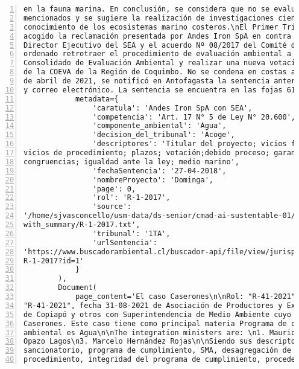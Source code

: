 \begin{Verbatim}[frame=lines, label=Elavoración propia -  Ejemplo de Contexto enviado por el Chatbot a OpenAI
				, fontsize=\scriptsize, numbers=left
				, baselinestretch=0.4
				, formatcom=\color{gray}]
en la fauna marina. En conclusión, se considera que no se evaluaron adecuadamente los impactos
mencionados y se sugiere la realización de investigaciones científicas para incrementar el
conocimiento de los ecosistemas marino costeros.\nEl Primer Tribunal Ambiental de Chile ha
acogido la reclamación presentada por Andes Iron SpA en contra de la Resolución 1146 del
Director Ejecutivo del SEA y el acuerdo Nº 08/2017 del Comité de Ministros. El tribunal ha
ordenado retrotraer el procedimiento de evaluación ambiental a la etapa posterior al Informe
Consolidado de Evaluación Ambiental y realizar una nueva votación ajustada a derecho por parte
de la COEVA de la Región de Coquimbo. No se condena en costas a las partes.\nResumen:\n\nEl 16
de abril de 2021, se notificó en Antofagasta la sentencia anterior a través del estado diario
y correo electrónico. La sentencia se encuentra en las fojas 6156.',
            metadata={
                'caratula': 'Andes Iron SpA con SEA',
                'competencia': 'Art. 17 N° 5 de Ley N° 20.600',
                'componente_ambiental': 'Agua',
                'decision_del_tribunal': 'Acoge',
                'descriptores': 'Titular del proyecto; vicios formales; motivaciòn; nulidad;
vicios de procedimiento; plazos; votación;debido proceso; garantías; contradictoriedad;
congruencias; igualdad ante la ley; medio marino',
                'fechaSentencia': '27-04-2018',
                'nombreProyecto': 'Dominga',
                'page': 0,
                'rol': 'R-1-2017',
                'source':
'/home/sjvasconcello/usm-data/ds-senior/cmad-ai-sustentable-01/etl/load/../../data/clean/docs_
with_summary/R-1-2017.txt',
                'tribunal': '1TA',
                'urlSentencia':
'https://www.buscadorambiental.cl/buscador-api/file/view/jurisprudencia/S1TA Rol N°
R-1-2017?id=1'
            }
        ),
        Document(
            page_content='El caso Caserones\n\nRol: "R-41-2021", Rol: "R-41-2021",Rol:
"R-41-2021", fecha 31-08-2021 de Asociación de Productores y Exportadores Agrícolas del Valle
de Copiapó y otros con Superintendencia de Medio Ambiente cuyo proyecto corresponde a Proyecto
Caserones. Este caso tiene como principal materia Programa de cumplimiento SMA y su coponente
ambiental es Agua\n\nThe integration ministers are: \n1. Mauricio Oviedo Gutiérrez\n2. Juan
Opazo Lagos\n3. Marcelo Hernández Rojas\n\nSiendo sus descriptores: Procedimiento
sancionatorio, programa de cumplimiento, SMA, desagregación de cargos, desviación del
procedimiento, integridad del programa de cumplimiento, procedencia del PDC, infracciones que

\end{Verbatim}
